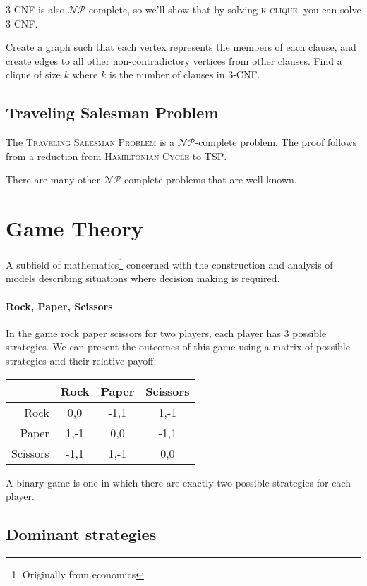 \documentclass{idc_msc}
\newcommand{\NPclass}{\mathcal{NP}}
\begin{document}
\textsc{3-CNF} is also \(\NPclass\)-complete, so we'll show that by solving \textsc{k-clique}, you can solve \textsc{3-CNF}.

Create a graph such that each vertex represents the members of each clause, and create edges to all other non-contradictory vertices from other clauses. Find a clique of size \(k\) where \(k\) is the number of clauses in \textsc{3-CNF}.

\subsection{Traveling Salesman Problem}

The \textsc{Traveling Salesman Problem} is a \(\NPclass\)-complete problem.
The proof follows from a reduction from \textsc{Hamiltonian Cycle} to \textsc{TSP}.

There are many other \(\NPclass\)-complete problems that are well known.

\section{Game Theory}

A subfield of mathematics\footnote{Originally from economics} concerned with the construction and analysis of models describing situations where decision making is required.

\paragraph{Rock, Paper, Scissors}

In the game rock paper scissors for two players, each player has 3 possible strategies.
We can present the outcomes of this game using a matrix of possible strategies and their relative payoff:

\begin{tabu} to \linewidth{|r|c|c|c|}
\hline
& Rock & Paper & Scissors \\
\hline
Rock & 0,0 & -1,1 & 1,-1 \\
\hline
Paper & 1,-1 & 0,0 & -1,1 \\
\hline
Scissors & -1,1 & 1,-1 & 0,0 \\
\hline
\end{tabu}

A binary game is one in which there are exactly two possible strategies for each player.

\subsection{Dominant strategies}
\end{document}
